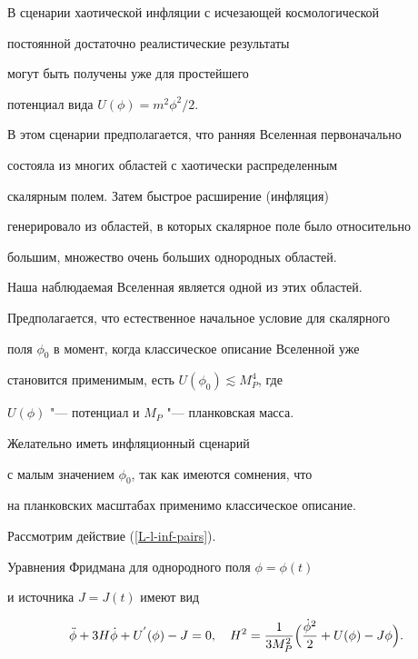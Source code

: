 В сценарии хаотической инфляции с исчезающей космологической

постоянной достаточно реалистические результаты

могут быть получены уже для простейшего

потенциал  вида $U(\phi)=m^2\phi^2/2$.

В этом сценарии предполагается, что ранняя Вселенная первоначально

состояла из многих областей с хаотически распределенным

скалярным полем. Затем быстрое расширение (инфляция)

генерировало из областей, в которых скалярное поле было относительно

большим, множество очень больших однородных областей.

Наша наблюдаемая Вселенная является одной из этих областей.



Предполагается, что естественное начальное условие для скалярного

поля $\phi_0$ в момент, когда классическое описание Вселенной уже

становится применимым, есть $U(\phi_0)\lesssim M_P^4$, где

$U(\phi)$ "--- потенциал и  $M_P$ "--- планковская масса.





Желательно иметь инфляционный сценарий

с малым значением $\phi_0$, так как имеются сомнения, что

на планковских масштабах применимо классическое описание.





Рассмотрим действие (\ref{L-l-inf-pairs}).

Уравнения Фридмана для однородного поля $\phi=\phi(t)$

и источника $J=J(t)$ имеют вид

\begin{gather*}

\ddot{\phi}+3H\dot{\phi}+U^{'}(\phi)-J=0,


\quad 

H^2=\frac{1}{3M_P^2}\Bigl(\frac{\dot{\phi}^2}{2}

+U(\phi)-J\phi\Bigr).

\end{gather*}



